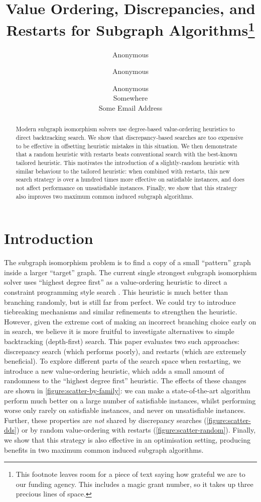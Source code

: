 \documentclass{article}
\title{Value Ordering, Discrepancies, and Restarts for Subgraph Algorithms\thanks{This footnote
leaves room for a piece of text saying how grateful we are to our funding agency. This includes a
magic grant number, so it takes up three precious lines of space.}}
\author{Anonymous \and Anonymous \and Anonymous \\ Somewhere \\ Some Email Address}
\newcommand{\citep}[1]{\cite{#1}}
\begin{document}
\maketitle

\begin{abstract}
    Modern subgraph isomorphism solvers use degree-based value-ordering heuristics to direct
    backtracking search. We show that discrepancy-based searches are too expensive to be effective
    in offsetting heuristic mistakes in this situation.  We then demonstrate that a random heuristic
    with restarts beats conventional search with the best-known tailored heuristic. This motivates
    the introduction of a slightly-random heuristic with similar behaviour to the tailored
    heuristic: when combined with restarts, this new search strategy is over a hundred times more
    effective on satisfiable instances, and does not affect performance on unsatisfiable instances.
    Finally, we show that this strategy also improves two maximum common induced subgraph
    algorithms.
\end{abstract}

\section{Introduction}

The subgraph isomorphism problem is to find a copy of a small ``pattern'' graph inside a larger
``target'' graph.  The current single strongest subgraph isomorphism solver uses ``highest degree
first'' as a value-ordering heuristic to direct a constraint programming style search
\citep{DBLP:conf/cp/McCreeshP15,DBLP:conf/lion/KotthoffMS16,DBLP:conf/ijcai/McCreeshPT16}. This
heuristic is much better than branching randomly, but is still far from perfect.  We could try to
introduce tiebreaking mechanisms and similar refinements to strengthen the heuristic. However, given
the extreme cost of making an incorrect branching choice early on in search, we believe it is more
fruitful to investigate alternatives to simple backtracking (depth-first) search. This paper
evaluates two such approaches: discrepancy search (which performs poorly), and restarts (which are
extremely beneficial). To explore different parts of the search space when restarting, we introduce
a new value-ordering heuristic, which adds a small amount of randomness to the ``highest degree
first'' heuristic.  The effects of these changes are shown in
\cref{figure:scatter-by-family}: we can make a state-of-the-art algorithm perform much better on a
large number of satisfiable instances, whilst performing worse only rarely on satisfiable instances,
and never on unsatisfiable instances.  Further, these properties are \emph{not} shared by
discrepancy searches (\cref{figure:scatter-dds}) or by random value-ordering with restarts
(\cref{figure:scatter-random}). Finally, we show that this strategy is also effective in an
optimisation setting, producing benefits in two maximum common induced subgraph algorithms.
\end{document}
